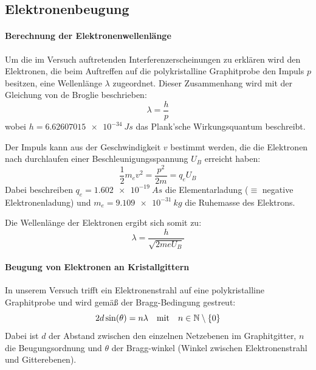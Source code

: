 \documentclass[ngerman]{scrartcl}
\begin{document}
\subsection{Elektronenbeugung}
\label{subsec:grundlagen_elektronenbeugung}

\paragraph{Berechnung der Elektronenwellenlänge}
%
Um die im Versuch auftretenden Interferenzerscheinungen zu erklären wird den Elektronen, die beim Auftreffen auf die polykristalline Graphitprobe den Impuls $p$
besitzen, eine Wellenlänge $\lambda$ zugeordnet. Dieser Zusammenhang wird mit der Gleichung von de Broglie beschrieben:
%
\begin{equation}
    \label{eq:de_broglie}
    \lambda = \frac{h}{p}
\end{equation}
%
wobei $h=\SI{6.62607015e-34}{Js}$ das Plank'sche Wirkungsquantum beschreibt.

Der Impuls kann aus der Geschwindigkeit $v$ bestimmt werden, die die Elektronen nach durchlaufen einer Beschleunigungsspannung $U_B$ erreicht haben:
%
\begin{equation}
    \label{eq:kinetische_energie}
    \frac{1}{2} m_e v^2 = \frac{p^2}{2 m} = q_e U_B
\end{equation}
%
Dabei beschreiben $q_e = \SI{1.602e-19}{As}$ die Elementarladung ($\equiv$ negative Elektronenladung) und $m_e = \SI{9.109e-31}{kg}$ die Ruhemasse des Elektrons.

Die Wellenlänge der Elektronen ergibt sich somit zu:
%
\begin{equation}
    \label{eq:wellenlaenge_elektronen}
    \lambda = \frac{h}{\sqrt{2 m e U_B}}
\end{equation}

\paragraph{Beugung von Elektronen an Kristallgittern}
%
In unserem Versuch trifft ein Elektronenstrahl auf eine polykristalline Graphitprobe und wird gemäß der Bragg-Bedingung gestreut:
%
\begin{equation}
    \label{eq:bragg}
    2 d \sin(\theta) = n \lambda \qq{mit} n \in \mathbb{N}\setminus\{0\}
\end{equation}
%
Dabei ist $d$ der Abstand zwischen den einzelnen Netzebenen im Graphitgitter, $n$ die Beugungsordnung und $\theta$ der Bragg-winkel (Winkel zwischen Elektronenstrahl und Gitterebenen).
\end{document}
